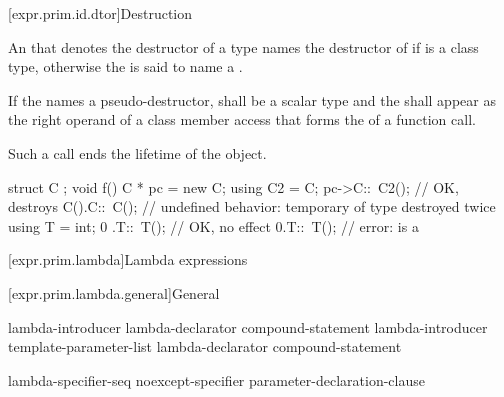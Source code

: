 [expr.prim.id.dtor]{Destruction}

\pnum
{}%
%
An  that denotes the destructor of a type 
names the destructor of 
if  is a class type,
otherwise the  is said
to name a .

\pnum
If the  names a pseudo-destructor,
 shall be a scalar type and
the  shall appear
as the right operand of a class member access that forms
the  of a function call.
\begin{note}
Such a call ends the lifetime of the object.
\end{note}

\pnum
\begin{example}
\begin{codeblock}
struct C { };
void f() {
  C * pc = new C;
  using C2 = C;
  pc->C::~C2();     // OK, destroys 
  C().C::~C();      // undefined behavior: temporary of type  destroyed twice
  using T = int;
  0 .T::~T();       // OK, no effect
  0.T::~T();        // error:  is a 
}
\end{codeblock}
\end{example}

[expr.prim.lambda]{Lambda expressions}%

[expr.prim.lambda.general]{General}%

\begin{bnf}
\br
    lambda-introducer  lambda-declarator compound-statement\br
    lambda-introducer \terminal{<} template-parameter-list \terminal{>}  \br
    \bnfindent lambda-declarator compound-statement
\end{bnf}

\begin{bnf}
\br
    \terminal{[}  \terminal{]}
\end{bnf}

\begin{bnf}
\br
    lambda-specifier-seq   \br
    noexcept-specifier  \br
    \br
    \terminal{(} parameter-declaration-clause \terminal{)}   \br
    \bnfindent {} 
\end{bnf}

